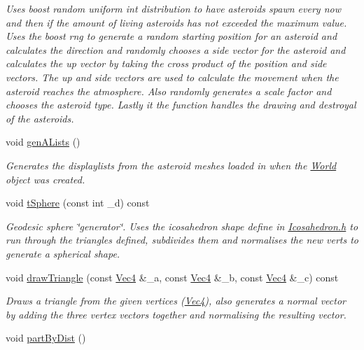 \begin{DoxyCompactItemize}
\begin{DoxyCompactList}\small\item\em Uses boost random uniform int distribution to have asteroids spawn every now and then if the amount of living asteroids has not exceeded the maximum value. Uses the boost rng to generate a random starting position for an asteroid and calculates the direction and randomly chooses a side vector for the asteroid and calculates the up vector by taking the cross product of the position and side vectors. The up and side vectors are used to calculate the movement when the asteroid reaches the atmosphere. Also randomly generates a scale factor and chooses the asteroid type. Lastly it the function handles the drawing and destroyal of the asteroids. \item\end{DoxyCompactList}\item 
\hypertarget{classWorld_a15d2bfd4eb929781af8ffabbf5d8398b}{
void \hyperlink{classWorld_a15d2bfd4eb929781af8ffabbf5d8398b}{genALists} ()}
\label{classWorld_a15d2bfd4eb929781af8ffabbf5d8398b}

\begin{DoxyCompactList}\small\item\em Generates the displaylists from the asteroid meshes loaded in when the \hyperlink{classWorld}{World} object was created. \item\end{DoxyCompactList}\item 
void \hyperlink{classWorld_af0ea326fb21e89cbc1bec14127e8289f}{tSphere} (const int \_\-d) const 
\begin{DoxyCompactList}\small\item\em Geodesic sphere \char`\"{}generator\char`\"{}. Uses the icosahedron shape define in \hyperlink{Icosahedron_8h}{Icosahedron.h} to run through the triangles defined, subdivides them and normalises the new verts to generate a spherical shape. \item\end{DoxyCompactList}\item 
void \hyperlink{classWorld_ac4ef03315e97218465a6fb29d6cded14}{drawTriangle} (const \hyperlink{classVec4}{Vec4} \&\_\-a, const \hyperlink{classVec4}{Vec4} \&\_\-b, const \hyperlink{classVec4}{Vec4} \&\_\-c) const 
\begin{DoxyCompactList}\small\item\em Draws a triangle from the given vertices (\hyperlink{classVec4}{Vec4}), also generates a normal vector by adding the three vertex vectors together and normalising the resulting vector. \item\end{DoxyCompactList}\item 
\hypertarget{classWorld_a580de360b07c68cc9e52c607c71eff4d}{
void \hyperlink{classWorld_a580de360b07c68cc9e52c607c71eff4d}{partByDist} ()}
\label{classWorld_a580de360b07c68cc9e52c607c71eff4d}


\end{DoxyCompactItemize}

